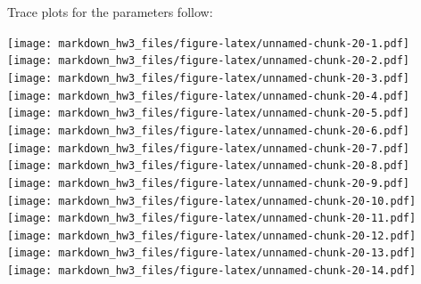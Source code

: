 \documentclass[]{article}
\newenvironment{Shaded}{\begin{snugshade}}{\end{snugshade}}
\newcommand{\KeywordTok}[1]{\textcolor[rgb]{0.94,0.87,0.69}{{#1}}}
\newcommand{\DataTypeTok}[1]{\textcolor[rgb]{0.87,0.87,0.75}{{#1}}}
\newcommand{\DecValTok}[1]{\textcolor[rgb]{0.86,0.86,0.80}{{#1}}}
\newcommand{\FloatTok}[1]{\textcolor[rgb]{0.75,0.75,0.82}{{#1}}}
\newcommand{\StringTok}[1]{\textcolor[rgb]{0.80,0.58,0.58}{{#1}}}
\newcommand{\CommentTok}[1]{\textcolor[rgb]{0.50,0.62,0.50}{{#1}}}
\newcommand{\NormalTok}[1]{\textcolor[rgb]{0.80,0.80,0.80}{{#1}}}
\begin{document}
\begin{Shaded}
\end{Shaded}

Trace plots for the parameters follow:

\texttt{[image: markdown\_hw3\_files/figure-latex/unnamed-chunk-20-1.pdf]}
\texttt{[image: markdown\_hw3\_files/figure-latex/unnamed-chunk-20-2.pdf]}
\texttt{[image: markdown\_hw3\_files/figure-latex/unnamed-chunk-20-3.pdf]}
\texttt{[image: markdown\_hw3\_files/figure-latex/unnamed-chunk-20-4.pdf]}
\texttt{[image: markdown\_hw3\_files/figure-latex/unnamed-chunk-20-5.pdf]}
\texttt{[image: markdown\_hw3\_files/figure-latex/unnamed-chunk-20-6.pdf]}
\texttt{[image: markdown\_hw3\_files/figure-latex/unnamed-chunk-20-7.pdf]}
\texttt{[image: markdown\_hw3\_files/figure-latex/unnamed-chunk-20-8.pdf]}
\texttt{[image: markdown\_hw3\_files/figure-latex/unnamed-chunk-20-9.pdf]}
\texttt{[image: markdown\_hw3\_files/figure-latex/unnamed-chunk-20-10.pdf]}
\texttt{[image: markdown\_hw3\_files/figure-latex/unnamed-chunk-20-11.pdf]}
\texttt{[image: markdown\_hw3\_files/figure-latex/unnamed-chunk-20-12.pdf]}
\texttt{[image: markdown\_hw3\_files/figure-latex/unnamed-chunk-20-13.pdf]}
\texttt{[image: markdown\_hw3\_files/figure-latex/unnamed-chunk-20-14.pdf]}
\end{document}
